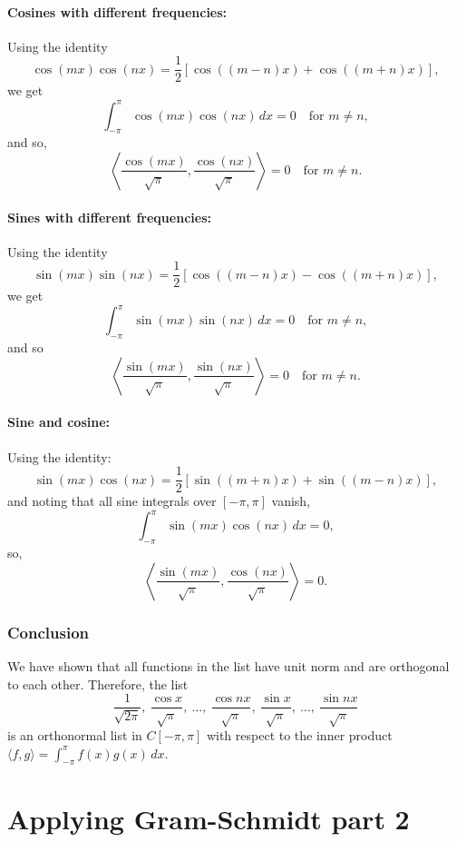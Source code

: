 \documentclass{article}
\begin{document}
\paragraph{Cosines with different frequencies:}

Using the identity
\[\cos(mx)\cos(nx) = \frac{1}{2}[\cos((m-n)x) + \cos((m+n)x)],\]
we get
\[\int_{-\pi}^{\pi} \cos(mx)\cos(nx)\, dx = 0 \quad \text{for } m \ne n,\]
and so,
\[\left\langle \frac{\cos(mx)}{\sqrt{\pi}}, \frac{\cos(nx)}{\sqrt{\pi}} \right\rangle = 0 \quad \text{for } m \ne n.\]

\paragraph{Sines with different frequencies:}

Using the identity
\[\sin(mx)\sin(nx) = \frac{1}{2}[\cos((m-n)x) - \cos((m+n)x)],\]
we get
\[\int_{-\pi}^{\pi} \sin(mx)\sin(nx)\, dx = 0 \quad \text{for } m \ne n,\]
and so
\[\left\langle \frac{\sin(mx)}{\sqrt{\pi}}, \frac{\sin(nx)}{\sqrt{\pi}} \right\rangle = 0 \quad \text{for } m \ne n.\]

\paragraph{Sine and cosine:}

Using the identity:
\[\sin(mx)\cos(nx) = \frac{1}{2}[\sin((m+n)x) + \sin((m-n)x)],\]
and noting that all sine integrals over \( [-\pi, \pi] \) vanish,
\[\int_{-\pi}^{\pi} \sin(mx)\cos(nx)\, dx = 0,\]
so,
\[\left\langle \frac{\sin(mx)}{\sqrt{\pi}}, \frac{\cos(nx)}{\sqrt{\pi}} \right\rangle = 0.\]

\subsubsection*{Conclusion}

We have shown that all functions in the list have unit norm and are orthogonal to each other. Therefore, the list
\[\frac{1}{\sqrt{2\pi}},\ \frac{\cos x}{\sqrt{\pi}},\ \ldots,\ \frac{\cos nx}{\sqrt{\pi}},\ \frac{\sin x}{\sqrt{\pi}},\ \ldots,\ \frac{\sin nx}{\sqrt{\pi}}\]
is an orthonormal list in $C[-\pi, \pi]$ with respect to the inner product \newline$\langle f, g \rangle = \int_{-\pi}^{\pi} f(x) g(x)\, dx$.

\clearpage

\section{Applying Gram-Schmidt part 2}
\end{document}
